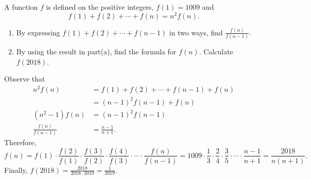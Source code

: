 \begin{question}
    A function $f$ is defined on the positive integers, $f(1) = 1009$ and 
    \[f(1) + f(2) + \cdots + f(n) = n^2 f(n).\]
    \begin{enumerate}
        \item By expressing $f(1) + f(2) + \cdots + f(n - 1)$ in two ways, find
            $\frac{f(n)}{f(n - 1)}$. 
        
        \item By using the result in part(a), find the formula for $f(n)$.
            Calculate $f(2018)$. 
    \end{enumerate}
\end{question}
\begin{solution}
    Observe that
    \begin{align*}
    n^2f(n) &= f(1) + f(2) + \cdots + f(n - 1) + f(n)\\
    &= (n - 1)^2f(n - 1) + f(n)\\
    (n^2 - 1)f(n) &= (n - 1)^2f(n - 1)\\
    \frac{f(n)}{f(n - 1)} &= \frac{n - 1}{n + 1}.
    \end{align*}
    Therefore,
    \[ f(n) = f(1) \cdot \frac{f(2)}{f(1)} \cdot \frac{f(3)}{f(2)} \cdot
    \frac{f(4)}{f(3)}\cdot\cdots\cdot\frac{f(n)}{f(n - 1)} = 1009 \cdot
    \frac{1}{3} \cdot \frac{2}{4} \cdot \frac{3}{5} \cdot\cdots\cdot \frac{n - 1}{n
    + 1} = \frac{2018}{n(n + 1)}.\]
    Finally, $f(2018) = \frac{2018}{2018 \cdot 2019} = \frac{1}{2019}$.
\end{solution}

